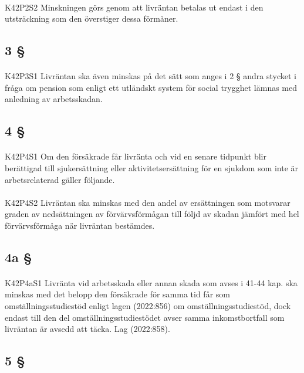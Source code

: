 \documentclass[a4paper,notitlepage,openany,10pt]{book}
\begin{document}
\paragraph*{}
{\tiny K42P2S2}
Minskningen görs genom att livräntan betalas ut endast i den utsträckning som den överstiger dessa förmåner.
\subsection*{3 §}
\paragraph*{}
{\tiny K42P3S1}
Livräntan ska även minskas på det sätt som anges i 2 § andra stycket i fråga om pension som enligt ett utländskt system för social trygghet lämnas med anledning av arbetsskadan.
\subsection*{4 §}
\paragraph*{}
{\tiny K42P4S1}
Om den försäkrade får livränta och vid en senare tidpunkt blir berättigad till sjukersättning eller aktivitetsersättning för en sjukdom som inte är arbetsrelaterad gäller följande.
\paragraph*{}
{\tiny K42P4S2}
Livräntan ska minskas med den andel av ersättningen som motsvarar graden av nedsättningen av förvärvsförmågan till följd av skadan jämfört med hel förvärvsförmåga när livräntan bestämdes.
\subsection*{4a §}
\paragraph*{}
{\tiny K42P4aS1}
Livränta vid arbetsskada eller annan skada som avses i 41-44 kap. ska minskas med det belopp den försäkrade för samma tid får som omställningsstudiestöd enligt lagen (2022:856) om omställningsstudiestöd, dock endast till den del omställningsstudiestödet avser samma inkomstbortfall som livräntan är avsedd att täcka.
Lag (2022:858).
\subsection*{5 §}
\end{document}
